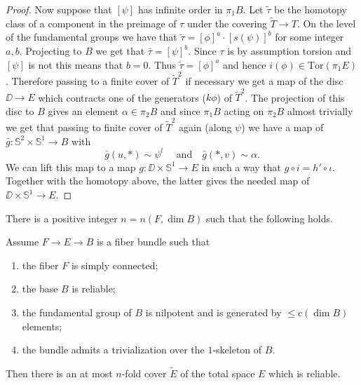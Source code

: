 \documentclass{amsart}
\begin{document}
\begin{proof}
Now suppose that $[\psi]$ has infinite order in $\pi_1B$. 
Let $\tilde\tau$ be the homotopy class of a component in the preimage of $\tau$ under the covering $\tilde T\to T$. 
On the level of  the fundamental groups we have that $\tilde\tau=[\phi]^a{\cdot} [s(\psi)]^b$ for some integer $a,b$. Projecting to $B$ we get that $\bar\tau=[\psi]^b$. Since $\tau$ is by assumption torsion and $[\psi]$ is not this means that $b=0$. Thus $\tilde\tau=[\phi]^a$ and hence
$i(\phi)\in \mathrm{Tor}(\pi_1E)$. 
Therefore passing to a finite cover of $\tilde T^2$ 
if necessary we get a map of the 
disc $\DD\to E$ which contracts one of the generators ($k \phi$) of $\tilde T^2$.
The projection of this disc to $B$ gives an element $\alpha\in \pi_2B$ 
and since $\pi_1B$ acting on $\pi_2B$ almost trivially we get 
that passing to finite cover of $\tilde T^2$ again (along $\psi$) we have a map of $\bar g\colon \mathbb{S}^2\times \mathbb{S}^1\to B$ with
$$ 
 \bar g(u,*)\sim\psi^l\quad\text{ and}\quad
 \bar g(*,v)\sim\alpha.$$
We can lift this map to a map $g\colon \DD\times \mathbb{S}^1\to E$ in such a way that $g\circ i=h'\circ \iota$. 
Together with the homotopy above, the latter gives the needed map of 
$\DD\times \mathbb{S}^1\to E$.
\end{proof}

\begin{claim} 
There is a positive integer $n=n(F,\dim B)$ such that the following holds.

Assume $F\to E\to B$ 
is a fiber bundle such that
\begin{enumerate}[(1)]
\item the fiber $F$ is simply connected;
\item the base $B$ is reliable;
\item the fundamental group of $B$ is nilpotent and is generated by $\le c(\dim B)$ elements;
\item the bundle admits a trivialization over the $1$-skeleton of $B$.
\end{enumerate}
Then there is an at most $n$-fold cover $\tilde E$ of the  total space $E$ which is reliable.
\end{claim}
\end{document}
